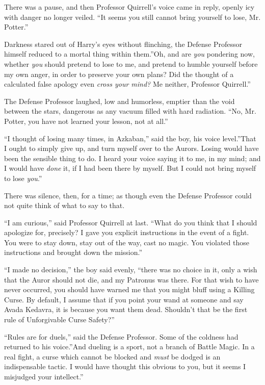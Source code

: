 There was a pause, and then Professor Quirrell's voice came in reply,
openly icy with danger no longer veiled. ``It seems you still cannot
bring yourself to lose, Mr. Potter.''

Darkness stared out of Harry's eyes without flinching, the Defense
Professor himself reduced to a mortal thing within them.''Oh, and are
\emph{you} pondering now, whether \emph{you} should pretend to lose to
me, and pretend to humble yourself before my own anger, in order to
preserve your own plans? Did the thought of a calculated false apology
even \emph{cross your mind?} Me neither, Professor Quirrell.''

The Defense Professor laughed, low and humorless, emptier than the void
between the stars, dangerous as any vacuum filled with hard radiation.
``No, Mr. Potter, you have not learned your lesson, not at all.''

``I thought of losing many times, in Azkaban,'' said the boy, his voice
level.''That I ought to simply give up, and turn myself over to the
Aurors. Losing would have been the sensible thing to do. I heard your
voice saying it to me, in my mind; and I would have \emph{done} it, if I
had been there by myself. But I could not bring myself to lose
\emph{you}.''

There was silence, then, for a time; as though even the Defense
Professor could not quite think of what to say to that.

``I am curious,'' said Professor Quirrell at last. ``What do you think
that I should apologize for, precisely? I gave you explicit instructions
in the event of a fight. You were to stay down, stay out of the way,
cast no magic. You violated those instructions and brought down the
mission.''

``I made no decision,'' the boy said evenly, ``there was no choice in
it, only a wish that the Auror should not die, and my Patronus was
there. For that wish to have never occurred, you should have warned me
that you might bluff using a Killing Curse. By default, I assume that if
you point your wand at someone and say Avada Kedavra, it is because you
want them dead. Shouldn't that be the first rule of Unforgivable Curse
Safety?''

``Rules are for duels,'' said the Defense Professor. Some of the
coldness had returned to his voice.''And dueling is a sport, not a
branch of Battle Magic. In a real fight, a curse which cannot be blocked
and \emph{must} be dodged is an indispensable tactic. I would have
thought this obvious to you, but it seems I misjudged your intellect.''

